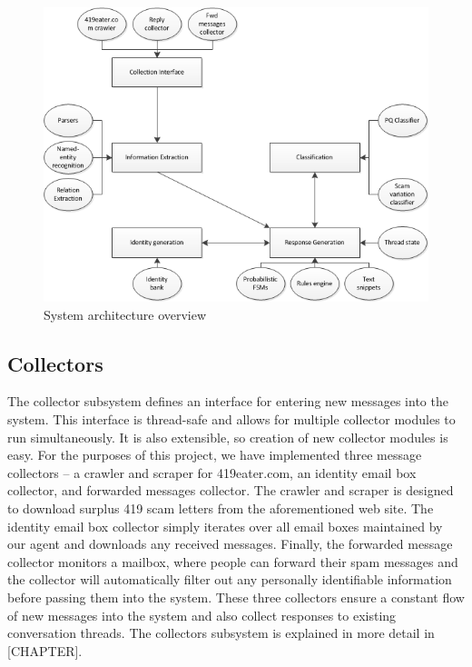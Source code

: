 \begin{figure}[h]
	\includegraphics{pics/system_smaller.png}
	\caption{System architecture overview}
\end{figure}


\subsection*{Collectors}
The collector subsystem defines an interface for entering new messages into the system. This interface is thread-safe and allows for multiple collector modules to run simultaneously. It is also extensible, so creation of new collector modules is easy. For the purposes of this project, we have implemented three message collectors – a crawler and scraper for 419eater.com, an identity email box collector, and forwarded messages collector. The crawler and scraper is designed to download surplus 419 scam letters from the aforementioned web site. The identity email box collector simply iterates over all email boxes maintained by our agent and downloads any received messages. Finally, the forwarded message collector monitors a mailbox, where people can forward their spam messages and the collector will automatically filter out any personally identifiable information before passing them into the system. These three collectors ensure a constant flow of new messages into the system and also collect responses to existing conversation threads. The collectors subsystem is explained in more detail in [CHAPTER].

